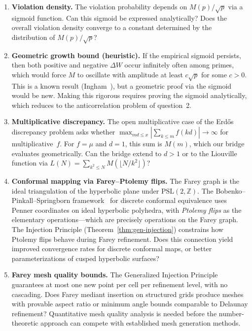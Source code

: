 \documentclass[11pt]{article}
\theoremstyle{definition}
\newcommand{\Z}{\mathbb{Z}}
\begin{document}
\begin{enumerate}
  \item \textbf{Violation density.}  The violation probability
    depends on $M(p)/\sqrt{p}$ via a sigmoid function.  Can this
    sigmoid be expressed analytically?  Does the overall violation
    density converge to a constant determined by the distribution
    of $M(p)/\sqrt{p}$?

  \item \textbf{Geometric growth bound (heuristic).}  If the
    empirical sigmoid persists, then both positive and negative
    $\Delta W$ occur infinitely often among primes, which would
    force $M$ to oscillate with amplitude at least
    $c\sqrt{p}$ for some $c > 0$.  This is a known result
    (Ingham~\cite{Ingham1942}), but a geometric proof via the sigmoid would
    be new.  Making this rigorous requires proving the
    sigmoid analytically, which reduces to the anticorrelation
    problem of question~2.

  \item \textbf{Multiplicative discrepancy.}  The open
    multiplicative case of the Erd\H{o}s discrepancy problem
    asks whether $\max_{md \le x}|\sum_{k \le m}f(kd)|
    \to \infty$ for multiplicative~$f$.  For $f = \mu$ and
    $d = 1$, this sum is $M(m)$, which our bridge evaluates
    geometrically.  Can the bridge extend to $d > 1$ or to
    the Liouville function via
    $L(N) = \sum_{k^2 \le N} M(\lfloor N/k^2 \rfloor)$?

  \item \textbf{Conformal mapping via Farey--Ptolemy flips.}
    The Farey graph is the ideal triangulation of the hyperbolic
    plane under $\mathrm{PSL}(2,\Z)$.  The Bobenko--Pinkall--Springborn
    framework~\cite{BPS2015} for discrete conformal equivalence
    uses Penner coordinates on ideal hyperbolic polyhedra, with
    \emph{Ptolemy flips} as the elementary operations---which are
    precisely operations on the Farey graph.  The Injection
    Principle (Theorem~\ref{thm:gen-injection}) constrains how
    Ptolemy flips behave during Farey refinement.  Does this
    connection yield improved convergence rates for discrete
    conformal maps, or better parameterizations of cusped
    hyperbolic surfaces?

  \item \textbf{Farey mesh quality bounds.}
    The Generalized Injection Principle guarantees at most one
    new point per cell per refinement level, with no cascading.
    Does Farey mediant insertion on structured grids produce
    meshes with provable aspect ratio or minimum angle bounds
    comparable to Delaunay refinement?  Quantitative mesh
    quality analysis is needed before the number-theoretic
    approach can compete with established mesh generation methods.


\end{enumerate}
\end{document}
